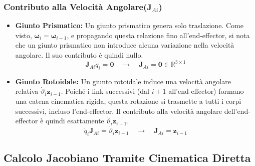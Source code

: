 \documentclass[11pt, a4paper]{report}
\begin{document}
\subsubsection{Contributo alla Velocità Angolare(\texorpdfstring{$\mathbf{J}_{Ai}$}{J Ai})}
\begin{itemize}
    \item \textbf{Giunto Prismatico:} Un giunto prismatico genera solo traslazione. Come visto, \(\bm{\omega}_i = \bm{\omega}_{i-1}\), e propagando questa relazione fino all'end-effector, si nota che un giunto prismatico non introduce alcuna variazione nella velocità angolare. Il suo contributo è quindi nullo.
    \[
         \bm{J}_{Ai} \dot{q}_i = \bm{0} \quad \longrightarrow \quad \bm{J}_{Ai} = \bm{0} \in \mathbb{R}^{3 \times 1}
    \]

    \item \textbf{Giunto Rotoidale:} Un giunto rotoidale induce una velocità angolare relativa \(\dot{\vartheta}_i \bm{z}_{i-1}\). Poiché i link successivi (dal \(i+1\) all'end-effector) formano una catena cinematica rigida, questa rotazione si trasmette a tutti i corpi successivi, incluso l'end-effector. Il contributo alla velocità angolare dell'end-effector è quindi esattamente \(\dot{\vartheta}_i \bm{z}_{i-1}\).
    \[
        \dot{q}_i \bm{J}_{Ai} = \dot{\vartheta}_i \bm{z}_{i-1} \quad \longrightarrow \quad \bm{J}_{Ai} = \bm{z}_{i-1}
    \]
\end{itemize}
\newpage
\subsection{Calcolo Jacobiano Tramite Cinematica Diretta}
\end{document}
